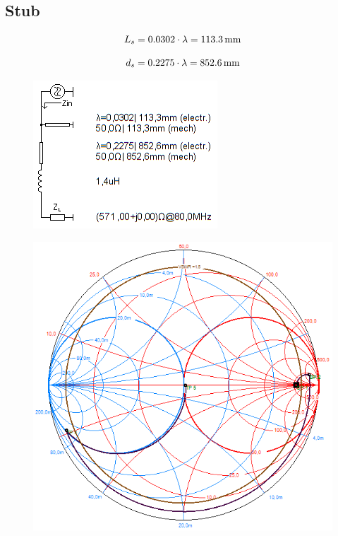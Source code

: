 \subsection{Stub}
\begin{equation*}
	\centering
	L_s = \num{0.0302}\cdot \lambda = \SI{113.3}{\milli\m}
\end{equation*}

\begin{equation*}
	\centering
	d_s = \num{0.2275}\cdot \lambda = \SI{852.6}{\milli\m}
\end{equation*}


\begin{figure}[H]
	\centering
	\includegraphics[scale=0.83]{imagenes/smith_stub_tierra_esq.png}
	\label{fig.smith_stub_tierra_esq}
\end{figure}
\begin{figure}[H]
	\centering
	\includegraphics[scale=0.63]{imagenes/smith_stub_tierra.png}
	\label{fig.smith_stub_tierra}
\end{figure}
